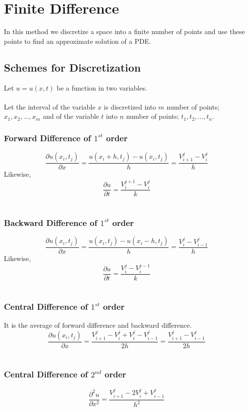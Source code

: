 \chapter{Finite Difference}
In this method we discretize a space into a finite number of points and use these points to find an
approximate solution of a PDE.

 \section{Schemes for Discretization}
Let $u=u(x,t)$ be a function in two variables. \\ \\
Let the interval of the variable $x$ is discretized into $m$ number of points; $x_1,x_2,...,x_m$ and
of the variable $t$ into $n$ number of points; $t_1, t_2,...,t_n$. \\

 \subsection{Forward Difference of \(1^{st}\) order}
 \[\frac{{\partial u}(x_i,t_j)}{\partial x} = \frac{u(x_i+h,t_j)-u(x_i,t_j)}{h} =
 \frac{V_{i+1}^j - V_i^j}{h}\]
 Likewise,\\
 \[\frac{\partial u}{\partial t} = \frac{V_i^{j+1}-V_i^j}{k}\] \\

 \subsection{Backward Difference of \(1^{st}\) order}
 \[\frac{{\partial u}(x_i,t_j)}{\partial x} = \frac{u(x_i,t_j)-u(x_i-h,t_j)}{h} =
 \frac{V_i^j - V_{i-1}^j}{h}\]
 Likewise,\\
 \[\frac{\partial u}{\partial t} = \frac{V_i^j-V_i^{j-1}}{k}\]\\

 \subsection{Central Difference of \(1^{st}\) order}
 It is the average of forward difference and backward difference.\\
 \[\frac{{\partial u}(x_i,t_j)}{\partial x} = \frac{V_{i+1}^j - V_i^j + V_i^j - V_{i-1}^j}{2h} =
 \frac{V_{i+1}^j - V_{i-1}^j}{2h}\] \\

 \subsection{Central Difference of \(2^{nd}\) order}
 \[\frac{\partial^2 u}{\partial x^2} = \frac{V_{i+1}^j-2V_i^j+V_{i-1}^j}{h^2}\]

